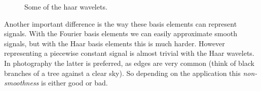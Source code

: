 \begin{figure}
	\centering
	\label{fig:haarwvlt}
	\caption{Some of the haar wavelets.}
\end{figure}

Another important difference is the way these basis elements can represent signals. With the Fourier basis elements we can easily approximate smooth signals, but with the Haar basis elements this is much harder. However representing a piecewise constant signal is almost trivial with the Haar wavelets. In photography the latter is preferred, as edges are very common (think of black branches of a tree against a clear sky). So depending on the application this \emph{non-smoothness} is either good or bad.
